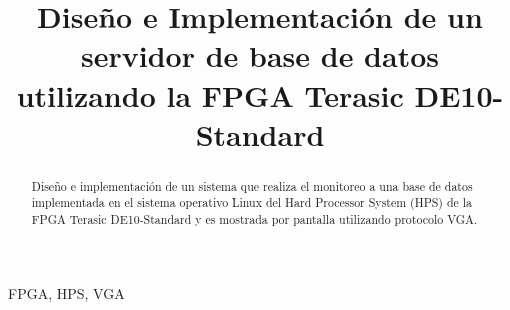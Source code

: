 \documentclass[conference]{IEEEtran}
\begin{document}
\title{
Diseño e Implementación de un servidor de base de datos utilizando la FPGA Terasic DE10-Standard \\
}

\author{
\and
{}
}

\maketitle

\begin{abstract}
	Diseño e implementación de un sistema que realiza el monitoreo a una base de datos implementada en el sistema operativo Linux del Hard Processor System (HPS) de la FPGA Terasic DE10-Standard y es mostrada por pantalla utilizando protocolo VGA.
\end{abstract}
\begin{IEEEkeywords}
FPGA, HPS, VGA
\end{IEEEkeywords}
\end{document}
